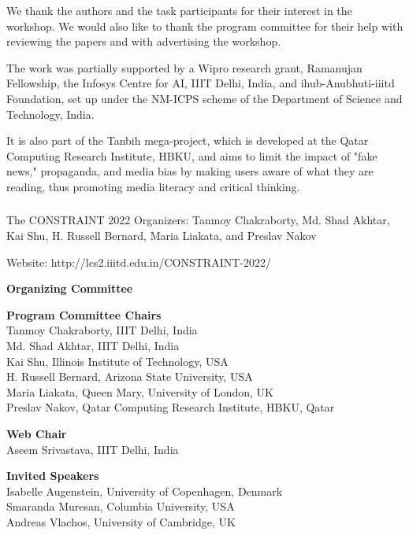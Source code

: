\documentclass[11pt,oneside]{book}
\begin{document}
We thank the authors and the task participants for their interest in the workshop. We would also like to thank the program committee for their help with reviewing the papers and with advertising the workshop.

The work was partially supported by a Wipro research grant, Ramanujan Fellowship, the Infosys Centre for AI, IIIT Delhi, India, and ihub-Anubhuti-iiitd Foundation, set up under the NM-ICPS scheme of the Department of Science and Technology, India.

It is also part of the Tanbih mega-project, which is developed at the Qatar Computing Research Institute, HBKU, and aims to limit the impact of "fake news," propaganda, and media bias by making users aware of what they are reading, thus promoting media literacy and critical thinking.

\subsubsection{}
The CONSTRAINT 2022 Organizers:
Tanmoy Chakraborty, Md. Shad Akhtar, Kai Shu, H. Russell Bernard, Maria Liakata, and Preslav Nakov 

Website: 
http://lcs2.iiitd.edu.in/CONSTRAINT-2022/

  \newpage

\begin{center}
{\Large \textbf{Organizing Committee}}
\end{center}
\vspace*{1cm}
\begin{description}
  \item{\bf Program Committee Chairs}\vspace{2mm}\\
      Tanmoy Chakraborty, IIIT Delhi, India\\
      Md. Shad Akhtar, IIIT Delhi, India\\
      Kai Shu, Illinois Institute of Technology, USA\\
      H. Russell Bernard, Arizona State University, USA\\
      Maria Liakata, Queen Mary, University of London, UK\\
      Preslav Nakov, Qatar Computing Research Institute, HBKU, Qatar\\
    \item{\bf Web Chair}\vspace{2mm}\\
      Aseem Srivastava, IIIT Delhi, India\\
    \item{\bf Invited Speakers}\vspace{2mm}\\
      Isabelle Augenstein, University of Copenhagen, Denmark\\
      Smaranda Muresan, Columbia University, USA\\
      Andreas Vlachos, University of Cambridge, UK\\
  \end{description}
\newpage
\end{document}

